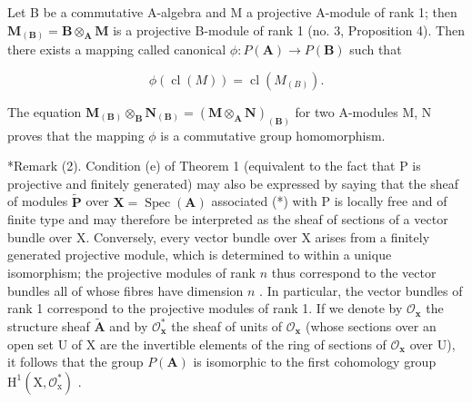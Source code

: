 Let B be a commutative A-algebra and M a projective A-module of rank 1; then \(\mathbf{M}_{(\mathbf{B})} = \mathbf{B} \otimes_{\mathbf{A}} \mathbf{M}\) is a projective B-module of rank 1 (no. 3, Proposition 4). Then there exists a mapping called canonical \(\phi: P(\mathbf{A}) \to P(\mathbf{B})\) such that

\[
\phi (\operatorname{cl} (M)) = \operatorname{cl} (M _ {(B)}).\tag{8}
\]

The equation \(\mathbf{M}_{(\mathbf{B})}\otimes_{\mathbf{B}}\mathbf{N}_{(\mathbf{B})}=(\mathbf{M}\otimes_{\mathbf{A}}\mathbf{N})_{(\mathbf{B})}\) for two A-modules M, N proves that the mapping \(\phi\) is a commutative group homomorphism.

*Remark (2). Condition (e) of Theorem 1 (equivalent to the fact that P is projective and finitely generated) may also be expressed by saying that the sheaf of modules \(\tilde{\mathbf{P}}\) over \(\mathbf{X} = \operatorname{Spec}(\mathbf{A})\) associated (*) with P is locally free and of finite type and may therefore be interpreted as the sheaf of sections of a vector bundle over X. Conversely, every vector bundle over X arises from a finitely generated projective module, which is determined to within a unique isomorphism; the projective modules of rank \(n\) thus correspond to the vector bundles all of whose fibres have dimension \(n\) . In particular, the vector bundles of rank 1 correspond to the projective modules of rank 1. If we denote by \(\mathcal{O}_{\mathbf{x}}\) the structure sheaf \(\tilde{\mathbf{A}}\) and by \(\mathcal{O}_{\mathbf{x}}^{*}\) the sheaf of units of \(\mathcal{O}_{\mathbf{x}}\) (whose sections over an open set U of X are the invertible elements of the ring of sections of \(\mathcal{O}_{\mathbf{x}}\) over U), it follows that the group \(P(\mathbf{A})\) is isomorphic to the first cohomology group \(\mathrm{H}^1 (\mathrm{X},\mathcal{O}_\mathrm{x}^*)\) .

